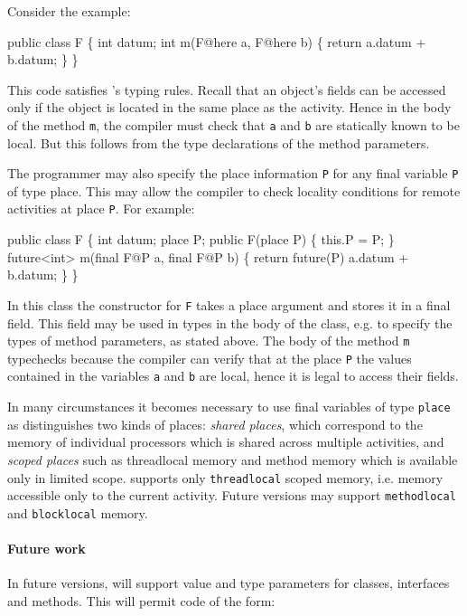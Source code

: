 Consider the example:
\begin{x10}
public class F \{
  int datum;
  int m(F@here a, F@here b) \{
    return a.datum + b.datum;
 \}
\}
\end{x10}
This code satisfies \Xten{}'s typing rules. Recall that 
an object's fields can be accessed only if the object is located in 
the same place as the activity. Hence in the body of the method
{\tt m}, the compiler must check that {\tt a} and {\tt b} are statically
known to be local. But this follows from the type declarations
of the method parameters. 

The programmer may also specify the place information {\tt P} for any
final variable {\tt P} of type place. This may allow the compiler to
check locality conditions for remote activities at place {\tt P}. For
example:
\begin{x10}
public class F \{
  int datum;
  place P;
  public F(place P) \{
    this.P = P;
  \}
  future<int> m(final F@P a, final F@P b) \{
    return future(P) {a.datum + b.datum;}
  \}
\}
\end{x10}
In this class the constructor for {\tt F} takes a place argument and
stores it in a final field. This field may be used in types in the
body of the class, e.g.{} to specify the types of method parameters,
as stated above. The body of the method {\tt m} typechecks because the
compiler can verify that at the place {\tt P} the values contained in
the variables {\tt a} and {\tt b} are local, hence it is legal to 
access their fields. 


In many circumstances it becomes necessary to use final variables of type
{\tt place} as 
\Xten{} distinguishes two kinds of places: {\em shared
places}\label{SharedPlaces}, which correspond to
the memory of individual processors which is shared across multiple
activities, and {\em scoped
places}\label{ScopedPlaces} such as threadlocal
memory and method memory which is available only in limited
scope. \XtenCurrVer{} supports only {\tt threadlocal} scoped memory,
i.e.{} memory accessible only to the current activity.  Future
versions may support {\tt methodlocal} and {\tt blocklocal} memory.

\paragraph{ Future work }

In future versions, \Xten{} will support value and type parameters for
classes, interfaces and methods. This will permit code of the form:

